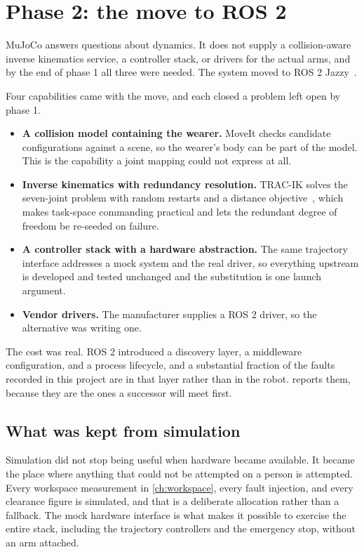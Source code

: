 \section{Phase 2: the move to ROS 2}

MuJoCo answers questions about dynamics. It does not supply a collision-aware
inverse kinematics service, a controller stack, or drivers for the actual
arms, and by the end of phase 1 all three were needed. The system moved to ROS
2 Jazzy~\cite{macenski2022ros2}.

Four capabilities came with the move, and each closed a problem left open by
phase 1.

\begin{itemize}
  \item \textbf{A collision model containing the wearer.} MoveIt checks
    candidate configurations against a scene, so the wearer's body can be part
    of the model. This is the capability a joint mapping could not express at
    all.
  \item \textbf{Inverse kinematics with redundancy resolution.} TRAC-IK solves
    the seven-joint problem with random restarts and a distance
    objective~\cite{beeson2015tracik}, which makes task-space commanding
    practical and lets the redundant degree of freedom be re-seeded on
    failure.
  \item \textbf{A controller stack with a hardware abstraction.} The same
    trajectory interface addresses a mock system and the real driver, so
    everything upstream is developed and tested unchanged and the substitution
    is one launch argument.
  \item \textbf{Vendor drivers.} The manufacturer supplies a ROS 2 driver, so
    the alternative was writing one.
\end{itemize}

The cost was real. ROS 2 introduced a discovery layer, a middleware
configuration, and a process lifecycle, and a substantial fraction of the
faults recorded in this project are in that layer rather than in the robot.
 reports them, because they are the ones a successor will
meet first.

\subsection{What was kept from simulation}

Simulation did not stop being useful when hardware became available. It became
the place where anything that could not be attempted on a person is
attempted. Every workspace measurement in \cref{ch:workspace}, every fault
injection, and every clearance figure is simulated, and that is a deliberate
allocation rather than a fallback. The mock hardware interface is what makes
it possible to exercise the entire stack, including the trajectory controllers
and the emergency stop, without an arm attached.

